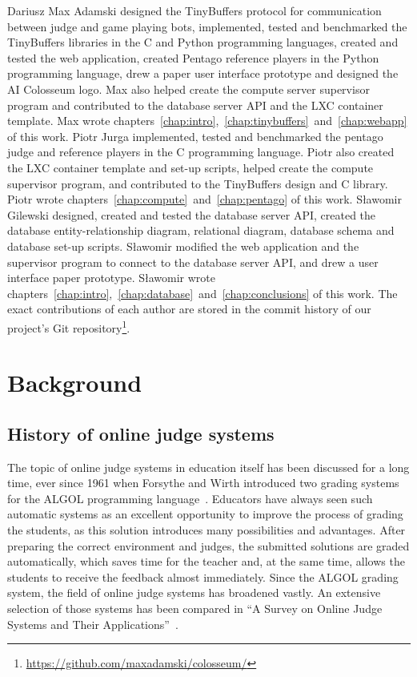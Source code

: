Dariusz Max Adamski designed the TinyBuffers protocol for communication between judge and game playing bots, implemented, tested and benchmarked the TinyBuffers libraries in the C and Python programming languages, created and tested the web application, created Pentago reference players in the Python programming language, drew a paper user interface prototype and designed the AI Colosseum logo. Max also helped create the compute server supervisor program and contributed to the database server API and the LXC container template. Max wrote chapters~\ref{chap:intro},~\ref{chap:tinybuffers}~and~\ref{chap:webapp} of this work.
Piotr Jurga implemented, tested and benchmarked the pentago judge and reference players in the C programming language. Piotr also created the LXC container template and set-up scripts, helped create the compute supervisor program, and contributed to the TinyBuffers design and C library. Piotr wrote chapters~\ref{chap:compute}~and~\ref{chap:pentago} of this work.
Sławomir Gilewski designed, created and tested the database server API, created the database entity-relationship diagram, relational diagram, database schema and database set-up scripts. Sławomir modified the web application and the supervisor program to connect to the database server API, and drew a user interface paper prototype. Sławomir wrote chapters~\ref{chap:intro},~\ref{chap:database}~and~\ref{chap:conclusions} of this work.
The exact contributions of each author are stored in the commit history of our project's Git repository\footnote{\url{https://github.com/maxadamski/colosseum/}}.

\chapter{Background} %
\label{chap:background}

\section{History of online judge systems}
The topic of online judge systems in education itself has been discussed for a long time, ever since 1961 when Forsythe and Wirth introduced two grading systems for the ALGOL programming language~\cite{Forsythe1965}. Educators have always seen such automatic systems as an excellent opportunity to improve the process of grading the students, as this solution introduces many possibilities and advantages. After preparing the correct environment and judges, the submitted solutions are graded automatically, which saves time for the teacher and, at the same time, allows the students to receive the feedback almost immediately. Since the ALGOL grading system, the field of online judge systems has broadened vastly. An extensive selection of those systems has been compared in ``A Survey on Online Judge Systems and Their Applications''~\cite{Wasik2017}.

